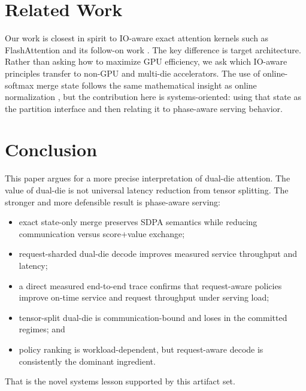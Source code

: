 \documentclass[10pt]{article}
\begin{document}
\section{Related Work}
Our work is closest in spirit to IO-aware exact attention kernels such as FlashAttention and its follow-on work \citep{dao2022flashattention,dao2023flashattention2}. The key difference is target architecture. Rather than asking how to maximize GPU efficiency, we ask which IO-aware principles transfer to non-GPU and multi-die accelerators. The use of online-softmax merge state follows the same mathematical insight as online normalization \citep{milakov2018online}, but the contribution here is systems-oriented: using that state as the partition interface and then relating it to phase-aware serving behavior.

\section{Conclusion}
This paper argues for a more precise interpretation of dual-die attention. The value of dual-die is not universal latency reduction from tensor splitting. The stronger and more defensible result is phase-aware serving:
\begin{itemize}[leftmargin=1.3em]
  \item exact state-only merge preserves SDPA semantics while reducing communication versus score+value exchange;
  \item request-sharded dual-die decode improves measured service throughput and latency;
  \item a direct measured end-to-end trace confirms that request-aware policies improve on-time service and request throughput under serving load;
  \item tensor-split dual-die is communication-bound and loses in the committed regimes; and
  \item policy ranking is workload-dependent, but request-aware decode is consistently the dominant ingredient.
\end{itemize}
That is the novel systems lesson supported by this artifact set.



\end{document}
